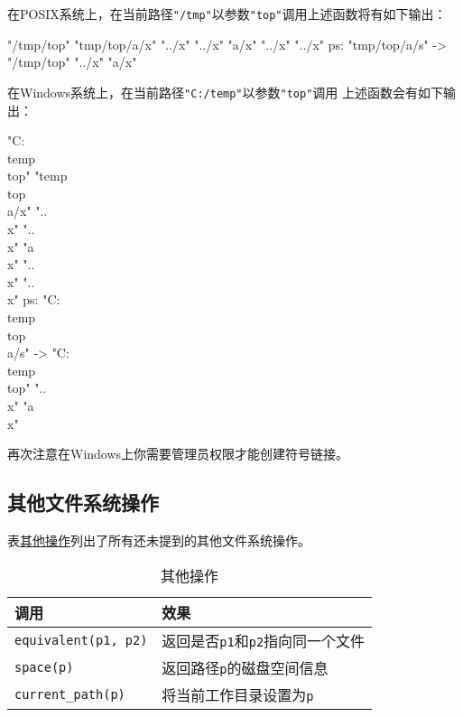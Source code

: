在POSIX系统上，在当前路径\texttt{"/tmp"}以参数\texttt{"top"}调用上述函数将有如下输出：
\begin{blacklisting}
    "/tmp/top"
    "tmp/top/a/x"
    "../x"
    "../x"
    "a/x"
    "../x"
    "../x"
    ps: "tmp/top/a/s" -> "/tmp/top"
    "../x"
    "a/x"
\end{blacklisting}
在Windows系统上，在当前路径\texttt{"C:/temp"}以参数\texttt{"top"}调用
上述函数会有如下输出：
\begin{blacklisting}
    "C:\\temp\\top"
    "temp\\top\\a/x"
    "..\\x"
    "..\\x"
    "a\\x"
    "..\\x"
    "..\\x"
    ps: "C:\\temp\\top\\a/s" -> "C:\\temp\\top"
    "..\\x"
    "a\\x"
\end{blacklisting}
再次注意在Windows上你需要管理员权限才能创建符号链接。

\subsection{其他文件系统操作}\label{ch20.4.6}
表\hyperref[t20.20]{其他操作}列出了所有还未提到的其他文件系统操作。
\begin{table}[htb]
    \centering
    \begin{tabular}{l|l}
        \hline
        \textbf{调用}                 & \textbf{效果}                        \\
        \hline
        \texttt{equivalent(p1, p2)} & 返回是否\texttt{p1}和\texttt{p2}指向同一个文件 \\
        \texttt{space(p)}           & 返回路径\texttt{p}的磁盘空间信息              \\
        \texttt{current\_path(p)}   & 将当前工作目录设置为\texttt{p}               \\
        \hline
    \end{tabular}
    \caption{其他操作}
    \label{t20.20}
\end{table}

